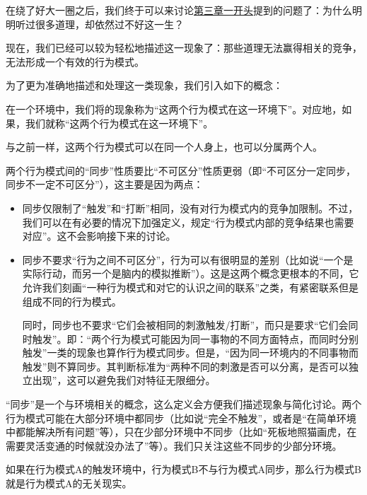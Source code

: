 在绕了好大一圈之后，我们终于可以来讨论\hyperref[para:假性成长]{第三章一开头}提到的问题了：为什么明明听过很多道理，却依然过不好这一生？
\begin{explain}
现在，我们已经可以较为轻松地描述这一现象了：那些道理无法赢得相关的竞争，无法形成一个有效的行为模式。\vspace{0.5em}
\insertparanotes
\end{explain}
为了更为准确地描述和处理这一类现象，我们引入如下的概念：

在一个环境中，我们将的现象称为“这两个行为模式在这一环境下”。对应地，如果，我们就称“这两个行为模式在这一环境下”。
\begin{explain}
与之前一样，这两个行为模式可以在同一个人身上，也可以分属两个人。

两个行为模式间的“同步”性质要比“不可区分”性质更弱（即“不可区分一定同步，同步不一定不可区分”），这主要是因为两点：
\begin{itemize}
\item 同步仅限制了“触发”和“打断”相同，没有对行为模式内的竞争加限制。不过，我们可以在有必要的情况下加强定义，规定“行为模式内部的竞争结果也需要对应”。这不会影响接下来的讨论。
\item 同步不要求“行为之间不可区分”，行为可以有很明显的差别（比如说“一个是实际行动，而另一个是脑内的模拟推断”）。这是这两个概念更根本的不同，它允许我们刻画“一种行为模式和对它的认识之间的联系”之类，有紧密联系但是组成不同的行为模式。

同时，同步也不要求“它们会被相同的刺激触发/打断”，而只是要求“它们会同时触发”。即：“两个行为模式可能因为同一事物的不同方面特点，而同时分别触发”一类的现象也算作行为模式同步。但是，“因为同一环境内的不同事物而触发”则不算同步。其判断标准为“两种不同的刺激是否可以分离，是否可以独立出现”，这可以避免我们对特征无限细分。
\end{itemize}
“同步”是一个与环境相关的概念，这么定义会方便我们描述现象与简化讨论。两个行为模式可能在大部分环境中都同步（比如说“完全不触发”，或者是“在简单环境中都能解决所有问题”等），只在少部分环境中不同步（比如“死板地照猫画虎，在需要灵活变通的时候就没办法了”等）。我们只关注这些不同步的少部分环境。
\end{explain}
如果在行为模式A的触发环境中，行为模式B不与行为模式A同步，那么行为模式B就是行为模式A的无关现实。

